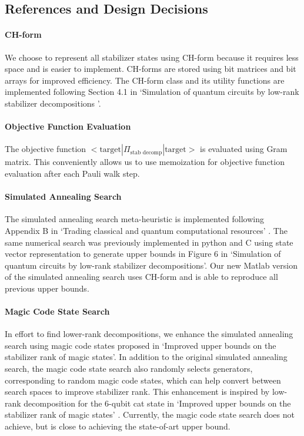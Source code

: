 \documentclass[11pt]{article}
\begin{document}
\subsection{References and Design Decisions}
\paragraph*{CH-form} We choose to represent all stabilizer states using CH-form because it requires less space and is easier to implement. CH-forms are stored using bit matrices and bit arrays for improved efficiency. The CH-form class and its utility functions are implemented following Section 4.1 in `Simulation of quantum circuits by low-rank stabilizer decompositions
'. \cite{Bravyi_2019}

\paragraph*{Objective Function Evaluation} The objective function $<\text{target}|\Pi_{\text{stab decomp}}|\text{target}>$ is evaluated using Gram matrix. This conveniently allows us to use memoization for objective function evaluation after each Pauli walk step. 

\paragraph*{Simulated Annealing Search} The simulated annealing search meta-heuristic is implemented following Appendix B in `Trading classical and quantum computational resources' \cite{Bravyi_2016}. The same numerical search was previously implemented in python and C using state vector representation to generate upper bounds in Figure 6 in `Simulation of quantum circuits by low-rank stabilizer decompositions'. Our new Matlab version of the simulated annealing search uses CH-form and is able to reproduce all previous upper bounds.\cite{Bravyi_2016,Bravyi_2019}

\paragraph*{Magic Code State Search} In effort to find lower-rank decompositions, we enhance the simulated annealing search using magic code states proposed in `Improved upper bounds on the stabilizer rank of magic states'. In addition to the original simulated annealing search, the magic code state search also randomly selects generators, corresponding to random magic code states, which can help convert between search spaces to improve stabilizer rank. This enhancement is inspired by low-rank decomposition for the 6-qubit cat state in `Improved upper bounds on the stabilizer rank of magic states' \cite{qassim2021improved}. Currently, the magic code state search does not achieve, but is close to achieving the state-of-art upper bound.
\end{document}

